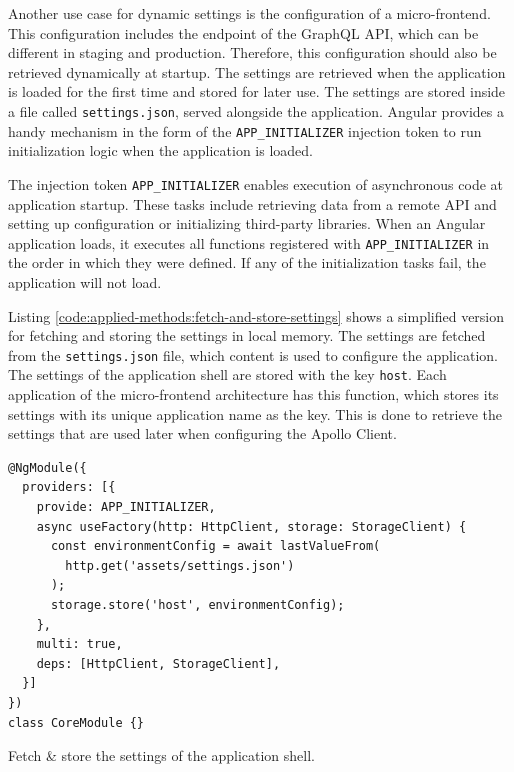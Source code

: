 \noindent Another use case for dynamic settings is the configuration of a micro-frontend. This configuration includes the endpoint of the GraphQL \ac{API}, which can be different in staging and production. Therefore, this configuration should also be retrieved dynamically at startup. The settings are retrieved when the application is loaded for the first time and stored for later use. The settings are stored inside a file called \texttt{settings.json}, served alongside the application. Angular provides a handy mechanism in the form of the \texttt{APP\_INITIALIZER} injection token to run initialization logic when the application is loaded.

\bigskip

\noindent The injection token \texttt{APP\_INITIALIZER} enables execution of asynchronous code at application startup. These tasks include retrieving data from a remote \ac{API} and setting up configuration or initializing third-party libraries. When an Angular application loads, it executes all functions registered with \texttt{APP\_INITIALIZER} in the order in which they were defined. If any of the initialization tasks fail, the application will not load. \cite{misc:-:applied-methods:prototype-implementation:angular-app-initializer}

\bigskip

\noindent Listing \ref{code:applied-methods:fetch-and-store-settings} shows a simplified version for fetching and storing the settings in local memory. The settings are fetched from the \texttt{settings.json} file, which content is used to configure the application. The settings of the application shell are stored with the key \texttt{host}. Each application of the micro-frontend architecture has this function, which stores its settings with its unique application name as the key. This is done to retrieve the settings that are used later when configuring the Apollo Client. 

\ifshowListings
\begin{listing}[H]
\begin{verbatim}
@NgModule({
  providers: [{
    provide: APP_INITIALIZER,
    async useFactory(http: HttpClient, storage: StorageClient) {
      const environmentConfig = await lastValueFrom(
        http.get('assets/settings.json')
      );
      storage.store('host', environmentConfig);
    },
    multi: true,
    deps: [HttpClient, StorageClient],
  }]
})
class CoreModule {}
\end{verbatim}
\caption{Fetch \& store the settings of the application shell.}\label{code:applied-methods:fetch-and-store-settings}
\end{listing}
\fi

